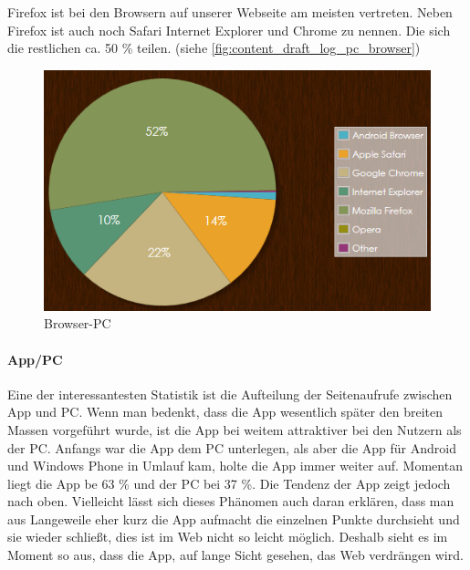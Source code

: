Firefox ist bei den Browsern auf unserer Webseite am meisten vertreten. Neben Firefox ist auch noch Safari Internet Explorer und Chrome zu nennen. Die sich die restlichen ca. 50 \% teilen. (siehe \autoref{fig:content_draft_log_pc_browser})

\begin{figure}[H]
\centering
\includegraphics[keepaspectratio=true, width=12cm]{images/screenshots/statistics/pc_browser.png}
\caption{Browser-PC}
\label{fig:content_draft_log_pc_browser}
\end{figure}

\paragraph{App/PC\\}
Eine der interessantesten Statistik ist die Aufteilung der Seitenaufrufe zwischen App und PC. Wenn man bedenkt, dass die App wesentlich später den breiten Massen vorgeführt wurde, ist die App bei weitem attraktiver bei den Nutzern als der PC. Anfangs war die App dem PC unterlegen, als aber die App für Android und Windows Phone in Umlauf kam, holte die App immer weiter auf. Momentan liegt die App be 63 \% und der PC bei 37 \%. Die Tendenz der App zeigt jedoch nach oben. Vielleicht lässt sich dieses Phänomen auch daran erklären, dass man aus Langeweile eher kurz die App aufmacht die einzelnen Punkte durchsieht und sie wieder schließt, dies ist im Web nicht so leicht möglich. Deshalb sieht es im Moment so aus, dass die App, auf lange Sicht gesehen, das Web verdrängen wird.

